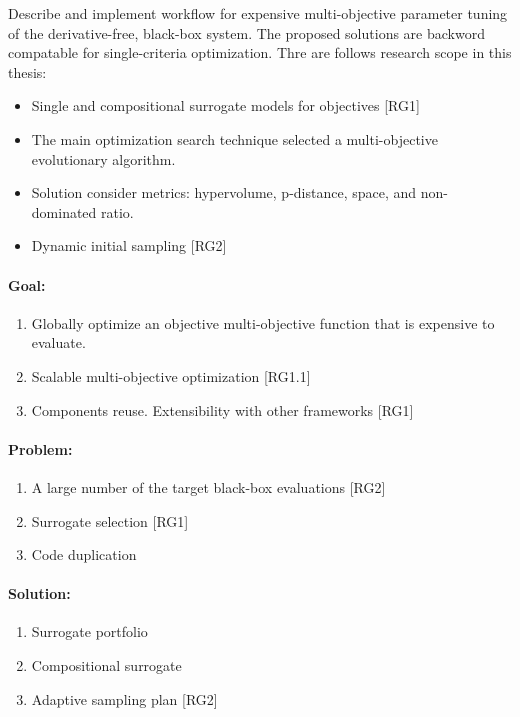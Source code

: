         Describe and implement workflow for expensive multi-objective parameter tuning of the derivative-free, black-box system. The proposed solutions are backword compatable for single-criteria optimization. 
        Thre are follows research scope in this thesis:
        \begin{itemize}
            \item Single and compositional surrogate models for objectives [RG1] 
            \item The main optimization search technique selected a multi-objective evolutionary algorithm.
            \item Solution consider metrics: hypervolume, p-distance, space, and non-dominated ratio.
            \item Dynamic initial sampling [RG2] 
        \end{itemize}

        \paragraph{Goal:}
        \begin{enumerate}
            \item Globally optimize an objective multi-objective function that is expensive to evaluate.
            \item Scalable multi-objective optimization [RG1.1]
            \item Components reuse. Extensibility with other frameworks [RG1]
        \end{enumerate}

        \paragraph{Problem:}
        \begin{enumerate}
            \item A large number of the target black-box evaluations [RG2]
            \item Surrogate selection [RG1]
            \item Code duplication
        \end{enumerate}

        \paragraph{Solution:}
        \begin{enumerate}
            \item Surrogate portfolio
            \item Compositional surrogate 
            \item Adaptive sampling plan [RG2]
        \end{enumerate}


